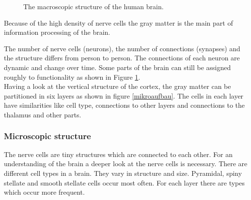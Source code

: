 \documentclass[a4paper]{article}
\begin{document}
\begin{figure}[!htbp]
{  \label{Aufbau2}
  }
  \hfill
  \caption{The macroscopic structure of the human brain.}
  \end{figure}
  Because of the high density of nerve cells the gray matter is the main part of information processing of the brain.
  
  The number of nerve cells (neurons), the number of connections (synapses) and the structure differs from person to person.
  The connections of each neuron are dynamic and change over time.
  Some parts of the brain can still be assigned roughly to functionality as shown in Figure \ref{Aufbau2}.\\
  Having a look at the vertical structure of the cortex,
  the gray matter can be partitioned in six layers as shown in figure \ref{mikroaufbau}.
  The cells in each layer have similarities like cell type, connections to other layers and connections to the thalamus and other parts.
 
 
  \newpage
  \subsubsection{Microscopic structure}
  The nerve cells are tiny structures which are connected to each other.
  For an understanding of the brain a deeper look at the nerve cells is necessary.
  There are different cell types in a brain. They vary in structure and size.
  Pyramidal, spiny stellate and smooth stellate cells occur most often.
  For each layer there are types which occur more frequent. 
  
\end{document}
